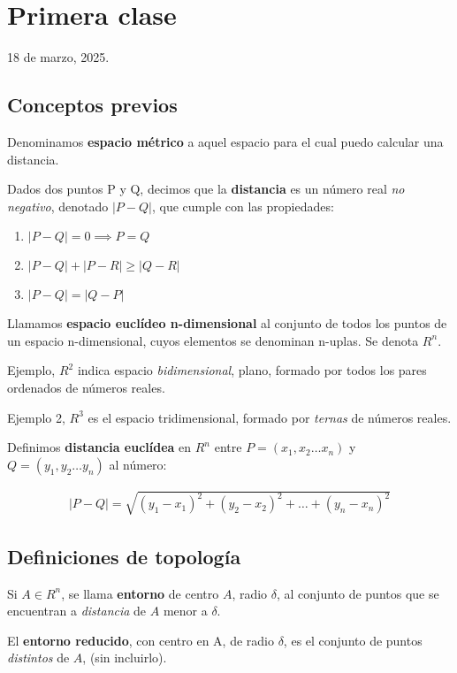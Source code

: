 \section{Primera clase}

18 de marzo, 2025.

\subsection{Conceptos previos}

Denominamos \textbf{espacio métrico}
a aquel espacio para el cual puedo calcular una distancia.

Dados dos puntos P y Q,
decimos que la \textbf{distancia} es un número real \textit{no negativo},
denotado \(|P-Q|\),
que cumple con las propiedades:

\begin{enumerate}
    \item \(|P-Q| = 0 \implies P = Q\)
    \item \(|P-Q| + |P-R| \geq |Q-R|\)
    \item \(|P-Q| = |Q-P|\)
\end{enumerate}

Llamamos \textbf{espacio euclídeo n-dimensional}
al conjunto de todos los puntos de un espacio n-dimensional,
cuyos elementos se denominan n-uplas.
Se denota \(R^{n}\).

Ejemplo, \(R^{2}\) indica espacio \textit{bidimensional},
plano,
formado por todos los pares ordenados de números reales.

Ejemplo 2, \(R^{3}\) es el espacio tridimensional,
formado por \textit{ternas} de números reales.

Definimos \textbf{distancia euclídea} en \(R^{n}\) 
entre \(P = (x_{1},x_2 \dots x_n)\) y \(Q = (y_{1},y_2 \dots y_n)\) al número:

\begin{align*}
    |P-Q| = \sqrt{(y_1 - x_1)^{2} + (y_2 - x_2)^{2} + \dots + (y_n - x_n)^{2}}
\end{align*}

\subsection{Definiciones de topología}

Si \(A \in R^{n}\), 
se llama \textbf{entorno} de centro \(A\),
radio \(\delta\),
al conjunto de puntos que se encuentran a \textit{distancia} de \(A\) menor a \(\delta\).

El \textbf{entorno reducido},
con centro en A,
de radio \(\delta\),
es el conjunto de puntos \textit{distintos} de \(A\),
(sin incluirlo).

